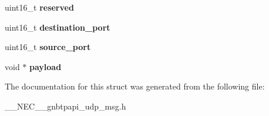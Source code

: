 \begin{DoxyCompactItemize}
\item 
\hypertarget{struct____NEC____gnbtpapi__geocast__tx__header_a13fb545ea448f8fa2f82e3f8aafa313c}{uint16\-\_\-t {\bfseries reserved}}\label{struct____NEC____gnbtpapi__geocast__tx__header_a13fb545ea448f8fa2f82e3f8aafa313c}

\item 
\hypertarget{struct____NEC____gnbtpapi__geocast__tx__header_a955cd44214859149c692d88b5409fd20}{uint16\-\_\-t {\bfseries destination\-\_\-port}}\label{struct____NEC____gnbtpapi__geocast__tx__header_a955cd44214859149c692d88b5409fd20}

\item 
\hypertarget{struct____NEC____gnbtpapi__geocast__tx__header_a05f3083266ef7082be048037dd924454}{uint16\-\_\-t {\bfseries source\-\_\-port}}\label{struct____NEC____gnbtpapi__geocast__tx__header_a05f3083266ef7082be048037dd924454}

\item 
\hypertarget{struct____NEC____gnbtpapi__geocast__tx__header_ac2fcac999ac7997e81a983ce186bbdeb}{void $\ast$ {\bfseries payload}}\label{struct____NEC____gnbtpapi__geocast__tx__header_ac2fcac999ac7997e81a983ce186bbdeb}

\end{DoxyCompactItemize}


\-The documentation for this struct was generated from the following file\-:\begin{DoxyCompactItemize}
\item 
\-\_\-\-\_\-\-N\-E\-C\-\_\-\-\_\-gnbtpapi\-\_\-udp\-\_\-msg.\-h\end{DoxyCompactItemize}
